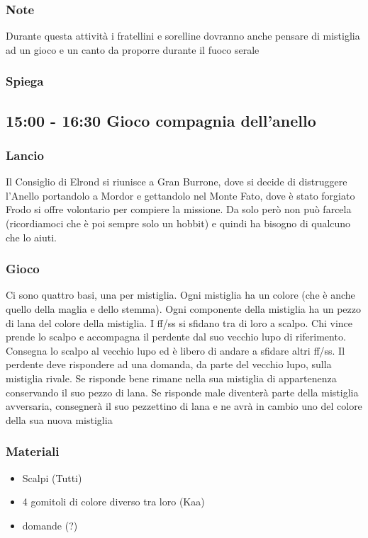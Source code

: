 \documentclass[../main.tex]{subfiles}
\begin{document}
        \subsubsection{Note}
        Durante questa attività i fratellini e sorelline dovranno anche pensare di mistiglia ad un gioco e un canto da proporre durante il fuoco serale
        \subsubsection{Spiega}
        
    \subsection{15:00 - 16:30 Gioco compagnia dell'anello}
       \subsubsection{Lancio}
       Il Consiglio di Elrond si riunisce a Gran Burrone, dove si decide di distruggere l'Anello portandolo a Mordor e gettandolo nel Monte Fato, dove è stato forgiato
       Frodo si offre volontario per compiere la missione. Da solo però non può farcela (ricordiamoci che è poi sempre solo un hobbit) e quindi ha bisogno di qualcuno che lo aiuti.
       \subsubsection{Gioco}
       Ci sono quattro basi, una per mistiglia. Ogni mistiglia ha un colore (che è anche quello della maglia e dello stemma). Ogni componente della mistiglia ha un pezzo di lana del colore della mistiglia. I ff/ss si sfidano tra di loro a scalpo. Chi vince prende lo scalpo e accompagna il perdente dal suo vecchio lupo di riferimento. Consegna lo scalpo al vecchio lupo ed è libero di andare a sfidare altri ff/ss. Il perdente deve rispondere ad una domanda, da parte del vecchio lupo, sulla mistiglia rivale. Se risponde bene rimane nella sua mistiglia di appartenenza conservando il suo pezzo di lana. Se risponde male diventerà parte della mistiglia avversaria, consegnerà il suo pezzettino di lana e ne avrà in cambio uno del colore della sua nuova mistiglia
       \subsubsection{Materiali}
       \begin{itemize}
           \item Scalpi (Tutti)
           \item 4 gomitoli di colore diverso tra loro (Kaa)
           \item domande (?)
       \end{itemize}
\end{document}

